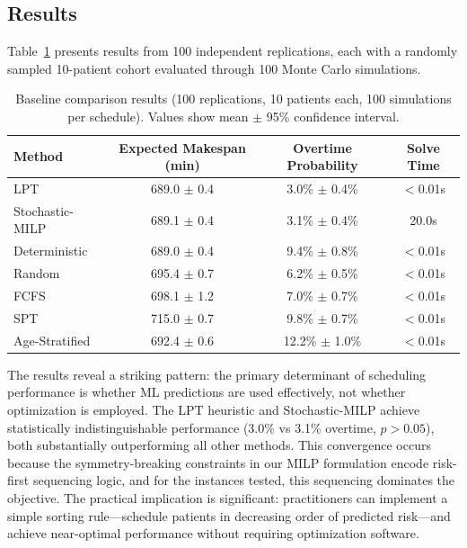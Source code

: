 \subsection{Results}
\label{sec:results}

Table~\ref{tab:baseline_results} presents results from 100 independent replications, each with a randomly sampled 10-patient cohort evaluated through 100 Monte Carlo simulations.

\begin{table}[htbp]
\centering
\caption{Baseline comparison results (100 replications, 10 patients each, 100 simulations per schedule). Values show mean $\pm$ 95\% confidence interval.}
\label{tab:baseline_results}
\begin{tabular}{@{}lccc@{}}
\toprule
\textbf{Method} & \textbf{Expected Makespan (min)} & \textbf{Overtime Probability} & \textbf{Solve Time} \\
\midrule
LPT & 689.0 $\pm$ 0.4 & 3.0\% $\pm$ 0.4\% & $<$0.01s \\
Stochastic-MILP & 689.1 $\pm$ 0.4 & 3.1\% $\pm$ 0.4\% & 20.0s \\
Deterministic & 689.0 $\pm$ 0.4 & 9.4\% $\pm$ 0.8\% & $<$0.01s \\
Random & 695.4 $\pm$ 0.7 & 6.2\% $\pm$ 0.5\% & $<$0.01s \\
FCFS & 698.1 $\pm$ 1.2 & 7.0\% $\pm$ 0.7\% & $<$0.01s \\
SPT & 715.0 $\pm$ 0.7 & 9.8\% $\pm$ 0.7\% & $<$0.01s \\
Age-Stratified & 692.4 $\pm$ 0.6 & 12.2\% $\pm$ 1.0\% & $<$0.01s \\
\bottomrule
\end{tabular}
\end{table}

The results reveal a striking pattern: the primary determinant of scheduling performance is whether ML predictions are used effectively, not whether optimization is employed. The LPT heuristic and Stochastic-MILP achieve statistically indistinguishable performance (3.0\% vs 3.1\% overtime, $p > 0.05$), both substantially outperforming all other methods. This convergence occurs because the symmetry-breaking constraints in our MILP formulation encode risk-first sequencing logic, and for the instances tested, this sequencing dominates the objective. The practical implication is significant: practitioners can implement a simple sorting rule---schedule patients in decreasing order of predicted risk---and achieve near-optimal performance without requiring optimization software.


